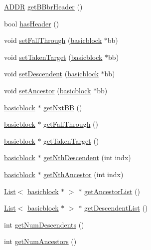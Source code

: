 \begin{DoxyCompactItemize}
\hyperlink{binaryTranslator_2global_8h_aa4557b0650cb21e57e3e4623410832c6}{ADDR} \hyperlink{classbasicblock_aba106088c0783baf1a57018bbc091fe1}{getBBbrHeader} ()
\item 
bool \hyperlink{classbasicblock_af49545fcc35042634fa48f78ca9f55cb}{hasHeader} ()
\item 
void \hyperlink{classbasicblock_ad97dd41248a01abbf1baa313845ff526}{setFallThrough} (\hyperlink{classbasicblock}{basicblock} $\ast$bb)
\item 
void \hyperlink{classbasicblock_af0d0269f9c9a3b52062170c667f436b2}{setTakenTarget} (\hyperlink{classbasicblock}{basicblock} $\ast$bb)
\item 
void \hyperlink{classbasicblock_aaede95419f42104aca674399aeef1a9b}{setDescendent} (\hyperlink{classbasicblock}{basicblock} $\ast$bb)
\item 
void \hyperlink{classbasicblock_a731087012c909b6d3875fa6fb5731bab}{setAncestor} (\hyperlink{classbasicblock}{basicblock} $\ast$bb)
\item 
\hyperlink{classbasicblock}{basicblock} $\ast$ \hyperlink{classbasicblock_aae1b2e9429abfe8474fb5f1bc5a204b2}{getNxtBB} ()
\item 
\hyperlink{classbasicblock}{basicblock} $\ast$ \hyperlink{classbasicblock_a8024f7c124db80125950b2582ee28e81}{getFallThrough} ()
\item 
\hyperlink{classbasicblock}{basicblock} $\ast$ \hyperlink{classbasicblock_a4be1cedc2d2596df89d3b9f118c0e445}{getTakenTarget} ()
\item 
\hyperlink{classbasicblock}{basicblock} $\ast$ \hyperlink{classbasicblock_a571a65129ed999a167803d516cb9455e}{getNthDescendent} (int indx)
\item 
\hyperlink{classbasicblock}{basicblock} $\ast$ \hyperlink{classbasicblock_a24ef17acb451da40eb9ecca3a05c9fb3}{getNthAncestor} (int indx)
\item 
\hyperlink{classList}{List}$<$ \hyperlink{classbasicblock}{basicblock} $\ast$ $>$ $\ast$ \hyperlink{classbasicblock_a006ea6066123e6c2a0ba76784dfcee1c}{getAncestorList} ()
\item 
\hyperlink{classList}{List}$<$ \hyperlink{classbasicblock}{basicblock} $\ast$ $>$ $\ast$ \hyperlink{classbasicblock_afac9781fe5c67f0d3f983d60e468dc8d}{getDescendentList} ()
\item 
int \hyperlink{classbasicblock_a42700afdf9102a0f287690f4f8c487f9}{getNumDescendents} ()
\item 
int \hyperlink{classbasicblock_af95ff01c9b4eb7a12cd58558771c92b2}{getNumAncestors} ()

\end{DoxyCompactItemize}
